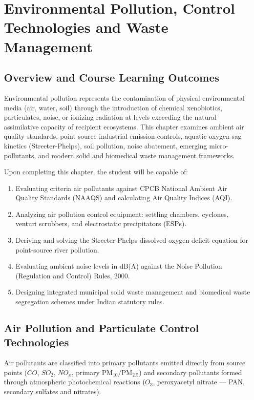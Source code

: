 \chapter{Environmental Pollution, Control Technologies and Waste Management}
\label{chap:pollution-waste}

\section{Overview and Course Learning Outcomes}
Environmental pollution represents the contamination of physical environmental media (air, water, soil) through the introduction of chemical xenobiotics, particulates, noise, or ionizing radiation at levels exceeding the natural assimilative capacity of recipient ecosystems. This chapter examines ambient air quality standards, point-source industrial emission controls, aquatic oxygen sag kinetics (Streeter-Phelps), soil pollution, noise abatement, emerging micro-pollutants, and modern solid and biomedical waste management frameworks.

\begin{important}
Upon completing this chapter, the student will be capable of:
\begin{enumerate}[leftmargin=1.5em]
    \item Evaluating criteria air pollutants against CPCB National Ambient Air Quality Standards (NAAQS) and calculating Air Quality Indices (AQI).
    \item Analyzing air pollution control equipment: settling chambers, cyclones, venturi scrubbers, and electrostatic precipitators (ESPs).
    \item Deriving and solving the Streeter-Phelps dissolved oxygen deficit equation for point-source river pollution.
    \item Evaluating ambient noise levels in dB(A) against the Noise Pollution (Regulation and Control) Rules, 2000.
    \item Designing integrated municipal solid waste management and biomedical waste segregation schemes under Indian statutory rules.
\end{enumerate}
\end{important}

\section{Air Pollution and Particulate Control Technologies}
Air pollutants are classified into primary pollutants emitted directly from source points ($CO$, $SO_2$, $NO_x$, primary $\text{PM}_{10}/\text{PM}_{2.5}$) and secondary pollutants formed through atmospheric photochemical reactions ($O_3$, peroxyacetyl nitrate --- PAN, secondary sulfates and nitrates).

